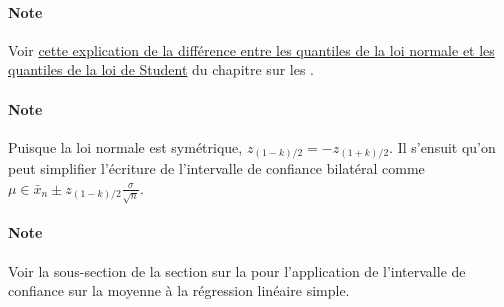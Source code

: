 \documentclass[french]{article}
\begin{document}
\begin{multicols*}{2}
\begin{center}
\begin{tikzpicture}[x=0.75pt,y=0.75pt,yscale=-1,xscale=1]
\end{tikzpicture}
\end{center}


\paragraph{Note}	Voir \hyperlink{normStudPerc}{\textcolor{bleudefrance}{cette explication de la différence entre les quantiles de la loi normale et les quantiles de la loi de Student}} du chapitre sur les \textit{\underline{}}. 

\paragraph{Note}	Puisque la loi normale est symétrique, $z_{(1 - k)/2} = -z_{(1 + k)/2}$. Il s'ensuit qu'on peut simplifier l'écriture de l'intervalle de confiance bilatéral comme $\mu \in \bar{x}_{n} \pm z_{(1 - k)/2} \frac{\sigma}{\sqrt{n}}$.

\paragraph{Note}	Voir la sous-section \textit{\underline{}} de la section sur la \textit{\underline{}} pour l'application de l'intervalle de confiance sur la moyenne à la régression linéaire simple.




\end{multicols*}
\end{document}
